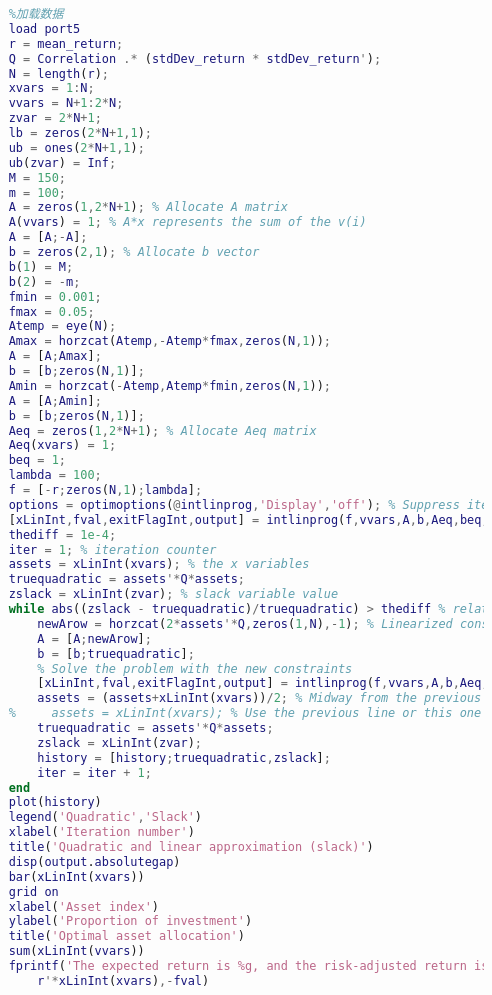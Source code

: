     \begin{lstlisting}[language = Matlab]
    %% 混合整数规划求解组合投资问题
    %加载数据
    load port5
    r = mean_return;
    Q = Correlation .* (stdDev_return * stdDev_return');
    N = length(r);
    xvars = 1:N;
    vvars = N+1:2*N;
    zvar = 2*N+1;
    lb = zeros(2*N+1,1);
    ub = ones(2*N+1,1);
    ub(zvar) = Inf;
    M = 150;
    m = 100;
    A = zeros(1,2*N+1); % Allocate A matrix
    A(vvars) = 1; % A*x represents the sum of the v(i)
    A = [A;-A];
    b = zeros(2,1); % Allocate b vector
    b(1) = M;
    b(2) = -m;
    fmin = 0.001;
    fmax = 0.05;
    Atemp = eye(N);
    Amax = horzcat(Atemp,-Atemp*fmax,zeros(N,1));
    A = [A;Amax];
    b = [b;zeros(N,1)];
    Amin = horzcat(-Atemp,Atemp*fmin,zeros(N,1));
    A = [A;Amin];
    b = [b;zeros(N,1)];
    Aeq = zeros(1,2*N+1); % Allocate Aeq matrix
    Aeq(xvars) = 1;
    beq = 1;
    lambda = 100;
    f = [-r;zeros(N,1);lambda];
    options = optimoptions(@intlinprog,'Display','off'); % Suppress iterative display
    [xLinInt,fval,exitFlagInt,output] = intlinprog(f,vvars,A,b,Aeq,beq,lb,ub,options);
    thediff = 1e-4;
    iter = 1; % iteration counter
    assets = xLinInt(xvars); % the x variables
    truequadratic = assets'*Q*assets;
    zslack = xLinInt(zvar); % slack variable value
    while abs((zslack - truequadratic)/truequadratic) > thediff % relative error
        newArow = horzcat(2*assets'*Q,zeros(1,N),-1); % Linearized constraint
        A = [A;newArow];
        b = [b;truequadratic];
        % Solve the problem with the new constraints
        [xLinInt,fval,exitFlagInt,output] = intlinprog(f,vvars,A,b,Aeq,beq,lb,ub,options);
        assets = (assets+xLinInt(xvars))/2; % Midway from the previous to the current
    %     assets = xLinInt(xvars); % Use the previous line or this one
        truequadratic = assets'*Q*assets;
        zslack = xLinInt(zvar);
        history = [history;truequadratic,zslack];
        iter = iter + 1;
    end
    plot(history)
    legend('Quadratic','Slack')
    xlabel('Iteration number')
    title('Quadratic and linear approximation (slack)')
    disp(output.absolutegap)
    bar(xLinInt(xvars))
    grid on
    xlabel('Asset index')
    ylabel('Proportion of investment')
    title('Optimal asset allocation')
    sum(xLinInt(vvars))
    fprintf('The expected return is %g, and the risk-adjusted return is %g.\n',...
        r'*xLinInt(xvars),-fval)
    \end{lstlisting}
% 
